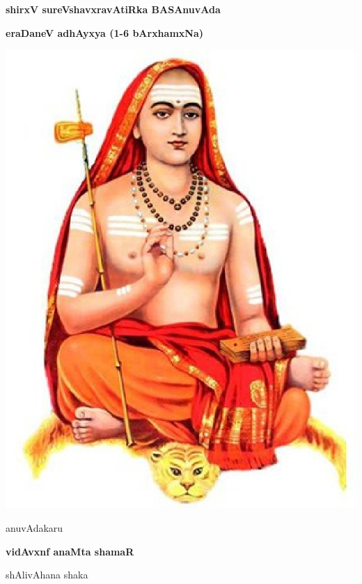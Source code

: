 \thispagestyle{empty}
\begin{center}
{\Huge\bfseries shirxV sureVshavxravAtiRka BASAnuvAda}
\bigskip

{\Large\bfseries eraDaneV adhAyxya (1-6 bArxhamxNa)}
\vfill

\includegraphics[scale=0.7]{figures/figure1.eps}

\vfill

anuvAdakaru
\smallskip

{\large\bfseries vidAvxnf anaMta shamaR}

\smallskip
shAlivAhana shaka
\end{center}
